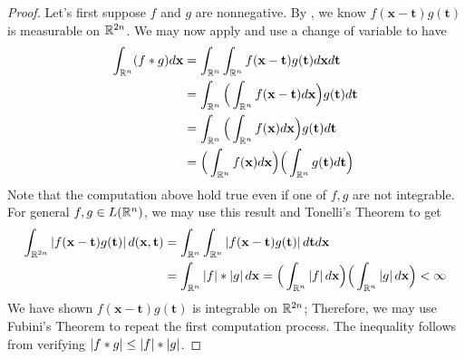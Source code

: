 \documentclass{report}
\begin{document}
\begin{proof}
  Let's first suppose $f$ and  $g$ are nonnegative. By , we know $f(\textbf{x}-\textbf{t})g(\textbf{t})$ is measurable on $\mathbb{R}^{2n}$. We may now apply  and use a change of variable to have 
\begin{align*}
\int_{\mathbb{R}^n}(f*g)d\textbf{x}&= \int_{\mathbb{R}^n}\int_{\mathbb{R}^n}f(\textbf{x}-\textbf{t})g(\textbf{t})d\textbf{x}d \textbf{t} \\
&=\int_{\mathbb{R}^n}\Big(\int_{\mathbb{R}^n}f(\textbf{x}-\textbf{t})d\textbf{x} \Big) g(\textbf{t}) d\textbf{t} \\
&=\int_{\mathbb{R}^n}\Big(\int_{\mathbb{R}^n}f(\textbf{x})d\textbf{x} \Big) g(\textbf{t})d\textbf{t} \\
&=\Big( \int_{\mathbb{R}^n} f(\textbf{x})d\textbf{x} \Big) \Big(\int_{\mathbb{R}^n}g(\textbf{t})d\textbf{t} \Big)
\end{align*}
Note that the computation above hold true even if one of $f,g$ are not integrable. For general $f,g \in L(\mathbb{R}^n)$, we may use this result and Tonelli's Theorem to get 
\begin{align*}
 \int_{\mathbb{R}^{2n}}\left|f(\textbf{x}-\textbf{t})g(\textbf{t})\right|d(\textbf{x},\textbf{t}) &=\int_{\mathbb{R}^n} \int_{\mathbb{R}^n}\left|f(\textbf{x}-\textbf{t})g(\textbf{t})\right|d\textbf{t} d\textbf{x} \\
  &=\int_{\mathbb{R}^n}\left|f\right|*\left|g\right|d\textbf{x} = \Big( \int_{\mathbb{R}^n}\left|f\right|d\textbf{x} \Big)\Big(\int_{\mathbb{R}^n}\left|g\right|d\textbf{x} \Big)<\infty
\end{align*}
We have shown $f(\textbf{x}-\textbf{t})g(\textbf{t})$ is integrable on $\mathbb{R}^{2n}$; Therefore, we may use Fubini's Theorem to repeat the first computation process. The inequality follows from verifying $\left|f * g\right|\leq \left|f\right| * \left|g\right|$. 
\end{proof}
\end{document}

